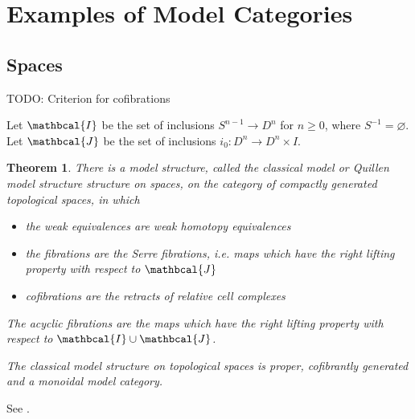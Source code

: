 \documentclass{scrartcl}
\theoremstyle{plain}
\newtheorem{theorem}{Theorem}[section]
\newtheorem{lemma}[theorem]{Lemma}
\theoremstyle{definition}
\newtheorem{example}[theorem]{Example}
\newcommand{\cat}[1]{\mathbcal{#1}}
\renewcommand{\emptyset}{\varnothing}
\newcommand{\union}{\mathbin{\cup}}
\let\xto\xrightarrow
\let\xfrom\xleftarrow
\renewcommand{\coprod}{\mathbin{\amalg}}
\DeclareMathOperator{\Ho}{Ho}
\begin{document}








\section{Examples of Model Categories}
\subsection{Spaces}\label{subsec:spaces_modelcat}
TODO: Criterion for cofibrations


Let $\cat I$ be the set of inclusions $S^{n-1}\to D^n$ for $n\geq 0$, where $S^{-1}=\emptyset$. Let $\cat J$ be the set of inclusions $i_0\colon D^n\to D^n\times I$.
\begin{theorem}
There is a model structure, called the classical model or Quillen model structure structure on spaces, on the category of compactly generated topological spaces, in which
\begin{itemize}
    \item the weak equivalences are weak homotopy equivalences
    \item the fibrations are the Serre fibrations, i.e. maps which have the right lifting property with respect to $\cat J$
    \item cofibrations are the retracts of relative cell complexes
\end{itemize}
The acyclic fibrations are the maps which have the right lifting property with respect to $\cat I\union\cat J$. 

The classical model structure on topological spaces is proper, cofibrantly generated and a monoidal model category. 
\end{theorem}
See \cite[17.2.2]{may2011more}.
\end{document}
